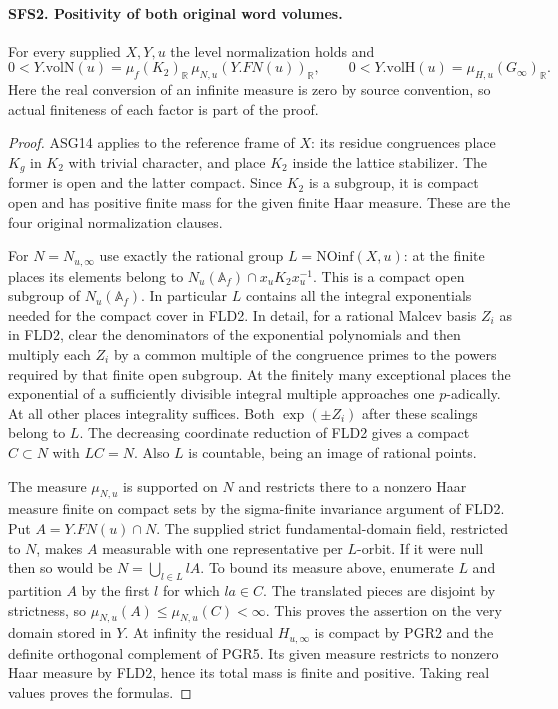 \paragraph{SFS2. Positivity of both original word volumes.}
\label{claim:SFS2}
For every supplied $X,Y,u$ the level normalization holds and
\[
 0<Y.\mathrm{volN}(u)=\mu_f(K_2)_{\mathbb R}\,
                  \mu_{N,u}(Y.FN(u))_{\mathbb R},\qquad
 0<Y.\mathrm{volH}(u)=\mu_{H,u}(G_\infty)_{\mathbb R}.
\]
Here the real conversion of an infinite measure is zero by source
convention, so actual finiteness of each factor is part of the proof.

\begin{proof}
ASG14 applies to the reference frame of $X$: its residue
congruences place $K_g$ in $K_2$ with trivial character, and place
$K_2$ inside the lattice stabilizer. The former is open and the
latter compact. Since $K_2$ is a subgroup, it is compact open
and has positive finite mass for the given finite Haar measure.
These are the four original normalization clauses.

For $N=N_{u,\infty}$ use exactly the rational group
$L=\mathrm{NOinf}(X,u)$: at the finite places its elements
belong to $N_u(\mathbb A_f)\cap x_uK_2x_u^{-1}$. This is a
compact open subgroup of $N_u(\mathbb A_f)$. In particular $L$
contains all the integral exponentials needed for the compact
cover in FLD2. In detail, for a rational Malcev basis $Z_i$ as
in FLD2, clear the denominators of the exponential polynomials
and then multiply each $Z_i$ by a common multiple of the
congruence primes to the powers required by that finite open
subgroup. At the finitely many exceptional places the exponential
of a sufficiently divisible integral multiple approaches one
$p$-adically. At all other places integrality suffices. Both
$\exp(\pm Z_i)$ after these scalings belong to $L$. The decreasing
coordinate reduction of FLD2 gives a compact $C\subset N$
with $LC=N$. Also $L$ is countable, being an image of rational points.

The measure $\mu_{N,u}$ is supported on $N$ and restricts there
to a nonzero Haar measure finite on compact sets by the
sigma-finite invariance argument of FLD2. Put $A=Y.FN(u)\cap N$.
The supplied strict fundamental-domain field, restricted to $N$,
makes $A$ measurable with one representative per $L$-orbit.
If it were null then so would be $N=\bigcup_{l\in L}lA$.
To bound its measure above, enumerate $L$ and partition $A$ by
the first $l$ for which $la\in C$. The translated pieces are
disjoint by strictness, so $\mu_{N,u}(A)\le\mu_{N,u}(C)<\infty$.
This proves the assertion on the very domain stored in $Y$.
At infinity the residual $H_{u,\infty}$ is compact by PGR2 and
the definite orthogonal complement of PGR5. Its given measure
restricts to nonzero Haar measure by FLD2, hence its total mass
is finite and positive. Taking real values proves the formulas.
\end{proof}

